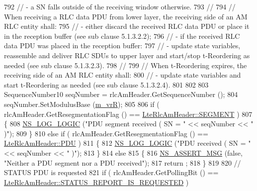 \begin{DoxyCode}
792       \textcolor{comment}{// - a SN falls outside of the receiving window otherwise.}
793       \textcolor{comment}{//}
794       \textcolor{comment}{// When receiving a RLC data PDU from lower layer, the receiving side of an AM RLC entity shall:}
795       \textcolor{comment}{// - either discard the received RLC data PDU or place it in the reception buffer (see sub clause
       5.1.3.2.2);}
796       \textcolor{comment}{// - if the received RLC data PDU was placed in the reception buffer:}
797       \textcolor{comment}{// - update state variables, reassemble and deliver RLC SDUs to upper layer and start/stop
       t-Reordering as needed (see sub clause 5.1.3.2.3).}
798       \textcolor{comment}{//}
799       \textcolor{comment}{// When t-Reordering expires, the receiving side of an AM RLC entity shall:}
800       \textcolor{comment}{// - update state variables and start t-Reordering as needed (see sub clause 5.1.3.2.4).}
801 
802 
803       SequenceNumber10 seqNumber = rlcAmHeader.GetSequenceNumber ();
804       seqNumber.SetModulusBase (\hyperlink{classns3_1_1LteRlcAm_aeec4bcfab747723421c68ed38feea081}{m\_vrR});
805 
806       \textcolor{keywordflow}{if} ( rlcAmHeader.GetResegmentationFlag () == \hyperlink{classns3_1_1LteRlcAmHeader_aa7a03eaac5875a18c2f95d3a0091d138a81153e1c386467eae03f6805ba812b83}{LteRlcAmHeader::SEGMENT} )
807         \{
808           \hyperlink{group__logging_ga88acd260151caf2db9c0fc84997f45ce}{NS\_LOG\_LOGIC} (\textcolor{stringliteral}{"PDU segment received ( SN = "} << seqNumber << \textcolor{stringliteral}{" )"});
809         \}
810       \textcolor{keywordflow}{else} \textcolor{keywordflow}{if} ( rlcAmHeader.GetResegmentationFlag () == \hyperlink{classns3_1_1LteRlcAmHeader_aa7a03eaac5875a18c2f95d3a0091d138a6f96f786048a3d5e5189aba4e21f5d22}{LteRlcAmHeader::PDU} )
811         \{
812           \hyperlink{group__logging_ga88acd260151caf2db9c0fc84997f45ce}{NS\_LOG\_LOGIC} (\textcolor{stringliteral}{"PDU received ( SN = "} << seqNumber << \textcolor{stringliteral}{" )"});
813         \}
814       \textcolor{keywordflow}{else}
815         \{
816           \hyperlink{assert_8h_aff5ece9066c74e681e74999856f08539}{NS\_ASSERT\_MSG} (\textcolor{keyword}{false}, \textcolor{stringliteral}{"Neither a PDU segment nor a PDU received"});
817           return ;
818         \}
819 
820       \textcolor{comment}{// STATUS PDU is requested}
821       \textcolor{keywordflow}{if} ( rlcAmHeader.GetPollingBit () == 
      \hyperlink{classns3_1_1LteRlcAmHeader_a06187336c96896fc4de926e99ed4489eaccbbecabb140527ecb181c55db4e309d}{LteRlcAmHeader::STATUS\_REPORT\_IS\_REQUESTED} )

\end{DoxyCode}

